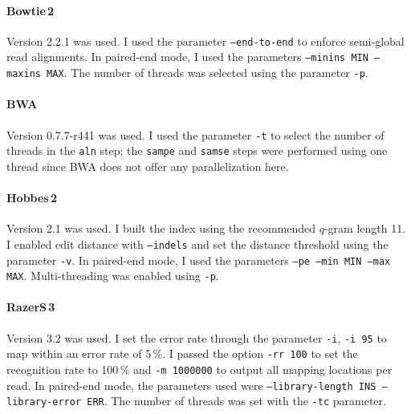 \paragraph{Bowtie\,2}
Version 2.2.1 was used.
I used the parameter \texttt{--end-to-end} to enforce semi-global read alignments.
In paired-end mode, I used the parameters \texttt{--minins MIN --maxins MAX}.
The number of threads was selected using the parameter \texttt{-p}.

\paragraph{BWA}
Version 0.7.7-r441 was used.
I used the parameter \texttt{-t} to select the number of threads in the \texttt{aln} step;
the \texttt{sampe} and \texttt{samse} steps were performed using one thread since BWA does not offer any parallelization here.

\paragraph{Hobbes\,2}
Version 2.1 was used.
I built the index using the recommended $q$-gram length 11.
I enabled edit distance with \texttt{--indels} and set the distance threshold using the parameter \texttt{-v}.
In paired-end mode, I used the parameters \texttt{--pe --min MIN --max MAX}.
Multi-threading was enabled using \texttt{-p}.

\paragraph{RazerS\,3}
Version 3.2 was used.
I set the error rate through the parameter \texttt{-i}, \eg \texttt{-i 95} to map within an error rate of 5\,\%.
I passed the option \texttt{-rr 100} to set the recognition rate to 100\,\% and \texttt{-m 1000000} to output all mapping locations per read.
In paired-end mode, the parameters used were \texttt{--library-length INS --library-error ERR}.
The number of threads was set with the \texttt{-tc} parameter.
